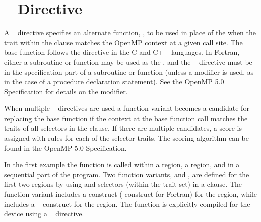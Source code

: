 \pagebreak
\section{~ Directive}
\label{sec:declare_variant}


A ~ directive specifies an alternate function, 
, to be used in place of the  
when the trait within the  clause matches the OpenMP context at a given call site.
The base function follows the directive in the C and C++ languages.
In Fortran, either a subroutine or function may be used as the ,
and the ~ directive must be in the specification 
part of a subroutine or function (unless a 
modifier is used, as in the case of a procedure declaration statement). See
the OpenMP 5.0 Specification for details on the modifier.

When multiple ~ directives are used 
a function variant becomes a candidate for replacing the base function if the
context at the base function call matches the traits of all selectors in the  clause.
If there are multiple candidates, a score is assigned with rules for each
of the selector traits. The scoring algorithm can be found in the OpenMP 5.0 Specification.

In the first example the  function is called within a  region,
a  region, and in a sequential part of the program.  Two function variants,  and ,
are defined for the first two regions by using  and  selectors (within
the  trait set) in a  clause.  The  function variant includes
a  construct ( construct for Fortran) for the  region, 
while  includes a ~ construct for the  region.
The  function is explicitly compiled for the device using a ~ directive.


